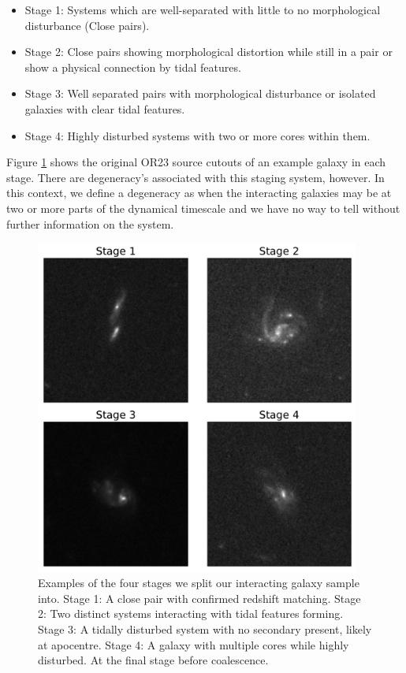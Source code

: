 \begin{itemize}
    \item Stage 1: Systems which are well-separated with little to no morphological disturbance (Close pairs).
    \item Stage 2: Close pairs showing morphological distortion while still in a pair or show a physical connection by tidal features.
    \item Stage 3: Well separated pairs with morphological disturbance or isolated galaxies with clear tidal features.
    \item Stage 4: Highly disturbed systems with two or more cores within them.
\end{itemize}

\noindent Figure \ref{fig:stages} shows the original OR23 source cutouts of an example galaxy in each stage. There are degeneracy's associated with this staging system, however. In this context, we define a degeneracy as when the interacting galaxies may be at two or more parts of the dynamical timescale and we have no way to tell without further information on the system.

\begin{figure}
    \centering
    \includegraphics[width=0.95\textwidth]{Chapter3/figures/examples-stages.pdf}
    \caption{Examples of the four stages we split our interacting galaxy sample into. Stage 1: A close pair with confirmed redshift matching. Stage 2: Two distinct systems interacting with tidal features forming. Stage 3: A tidally disturbed system with no secondary present, likely at apocentre. Stage 4: A galaxy with multiple cores while highly disturbed. At the final stage before coalescence.}
    \label{fig:stages}
\end{figure}

